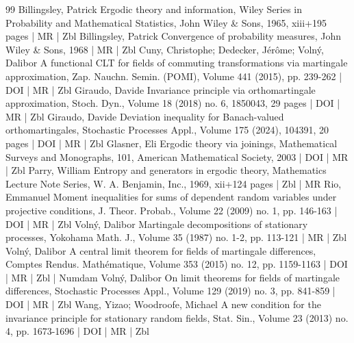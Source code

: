 \documentclass[10pt]{amsart}
\theoremstyle{definition}\newtheorem{defi}[theo]{Definition}\newtheorem{rema}[theo]{Remark}\newtheorem{exam}[theo]{Example}\newtheorem{exem}[theo]{Example}\newtheorem{nota}[theo]{Notation}
\begin{document}
\begin{thebibliography}{99}
 Billingsley, Patrick Ergodic theory and information, Wiley Series in Probability and Mathematical Statistics, John Wiley \& Sons, 1965, xiii+195 pages | MR | Zbl
 Billingsley, Patrick Convergence of probability measures, John Wiley \& Sons, 1968 | MR | Zbl
 Cuny, Christophe; Dedecker, Jérôme; Volný, Dalibor A functional CLT for fields of commuting transformations via martingale approximation, Zap. Nauchn. Semin. (POMI), Volume 441 (2015), pp. 239-262 | DOI | MR | Zbl
 Giraudo, Davide Invariance principle via orthomartingale approximation, Stoch. Dyn., Volume 18 (2018) no. 6, 1850043, 29 pages | DOI | MR | Zbl
 Giraudo, Davide Deviation inequality for Banach-valued orthomartingales, Stochastic Processes Appl., Volume 175 (2024), 104391, 20 pages | DOI | MR | Zbl
 Glasner, Eli Ergodic theory via joinings, Mathematical Surveys and Monographs, 101, American Mathematical Society, 2003 | DOI | MR | Zbl
 Parry, William Entropy and generators in ergodic theory, Mathematics Lecture Note Series, W. A. Benjamin, Inc., 1969, xii+124 pages | Zbl | MR
 Rio, Emmanuel Moment inequalities for sums of dependent random variables under projective conditions, J. Theor. Probab., Volume 22 (2009) no. 1, pp. 146-163 | DOI | MR | Zbl
 Volný, Dalibor Martingale decompositions of stationary processes, Yokohama Math. J., Volume 35 (1987) no. 1-2, pp. 113-121 | MR | Zbl
 Volný, Dalibor A central limit theorem for fields of martingale differences, Comptes Rendus. Mathématique, Volume 353 (2015) no. 12, pp. 1159-1163 | DOI | MR | Zbl | Numdam
 Volný, Dalibor On limit theorems for fields of martingale differences, Stochastic Processes Appl., Volume 129 (2019) no. 3, pp. 841-859 | DOI | MR | Zbl
 Wang, Yizao; Woodroofe, Michael A new condition for the invariance principle for stationary random fields, Stat. Sin., Volume 23 (2013) no. 4, pp. 1673-1696 | DOI | MR | Zbl
\end{thebibliography}
\end{document}
